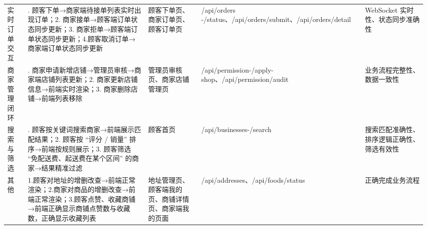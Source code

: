 \begin{levellist}
\begin{levellist}
\begin{longtable}{>{\centering\arraybackslash}m{1cm} >{\centering\arraybackslash}m{5cm} >{\centering\arraybackslash}m{2cm} >{\centering\arraybackslash}m{2.5cm} >{\centering\arraybackslash}m{2cm}}
            实时订单交互          & 1. 顾客下单→商家端待接单列表实时出现订单；2. 商家接单→顾客端订单状态同步更新；3. 商家拒单→顾客端订单状态同步更新；4.顾客取消订单→商家端订单状态同步更新   & 顾客下单页、商家订单页、顾客订单页          & /api/orders \newline -/status、/api/orders/submit、/api/orders/detail & WebSocket 实时性、状态同步准确性 \\
            商家管理闭环          & 1. 商家申请新增店铺→管理员审核→商家端店铺列表更新；2. 商家更新店铺信息→前端实时渲染；3. 商家删除店铺→前端列表移除                       & 管理员审核页、商家店铺管理页             & /api/permission\newline -/apply-shop、/api/permission/audit          & 业务流程完整性、数据一致性         \\
            搜索与筛选           & 1. 顾客按关键词搜索商家→前端展示匹配结果；2. 顾客按 “评分 / 销量” 排序→前端按规则展示；3. 顾客筛选 “免配送费、起送费在某个区间” 的商家→结果精准过滤 & 顾客首页                       & /api/businesses\newline -/search                                    & 搜索匹配准确性、排序逻辑正确性、筛选有效性 \\
            其他              & 1.顾客对地址的增删改查→前端正常渲染；2.商家对商品的增删改查→前端正常渲染；3.顾客点赞、收藏商铺→前端正确显示商铺点赞数与收藏数，正确显示收藏列表          & 地址管理页、顾客端我的页、商铺详情页、商家端我的页面 & /api/addresses、/api/foods/status                                    & 正确完成业务流程              \\
        \end{longtable}


\end{levellist}
\end{levellist}
